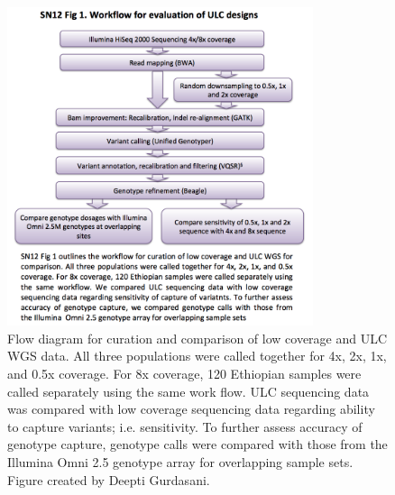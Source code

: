 \begin{figure}
\centering
\includegraphics[trim={0 4cm 0 1cm},clip,width=0.8\textwidth]{fig/SN12f1}
\caption[Work flow for evaluation of \gls{ULC} designs.]{Flow diagram for curation and comparison of low coverage and \gls{ULC} \gls{WGS} data. All three populations were called together for 4x, 2x, 1x, and 0.5x coverage. For 8x coverage, 120 Ethiopian samples were called separately using the  same  work flow. \gls{ULC} sequencing data was compared with low coverage sequencing data regarding ability to capture variants; i.e. sensitivity. To further assess accuracy of genotype capture, genotype calls were compared with those from the Illumina Omni 2.5 genotype array for overlapping sample sets. Figure created by Deepti Gurdasani.}
\label{fig:SN12f1}
\end{figure}